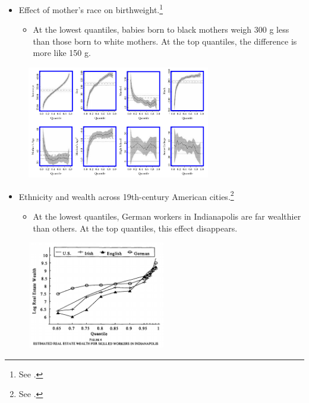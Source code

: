 \documentclass{beamer}
\begin{document}
\begin{frame}
	\begin{itemize}
		\item Effect of mother's race on birthweight.\footnote{See \cite{koenker2001quantile}.}
		\begin{itemize}
			\item At the lowest quantiles, babies born to black mothers weigh 300 g less than those born to white mothers. At the top quantiles, the difference is more like 150 g. 
		\end{itemize}
	\end{itemize}
	\begin{figure}
		\includegraphics[width=8cm]{koenker-birthweight.png}
		\centering
	\end{figure}
\end{frame}

\begin{frame}
	\begin{itemize}
		\item Ethnicity and wealth across 19th-century American cities.\footnote{See \cite{conley1998nativity}.}
		\begin{itemize}
			\item At the lowest quantiles, German workers in Indianapolis are far wealthier than others. At the top quantiles, this effect disappears. 
		\end{itemize}
	\end{itemize}
	\begin{figure}
		\includegraphics[width=6cm]{conley-realestate.png}
		\centering
	\end{figure}
\end{frame} 
\end{document}
